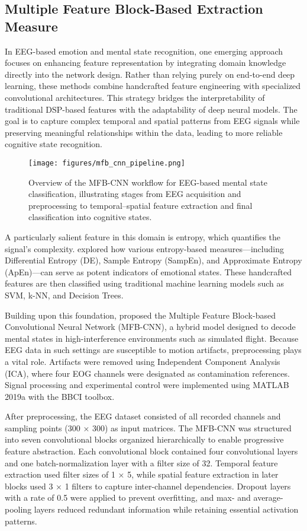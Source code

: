 \documentclass[conference]{IEEEtran}
\begin{document}
\subsection{Multiple Feature Block-Based Extraction Measure}
In EEG-based emotion and mental state recognition, one emerging approach focuses on enhancing feature representation by integrating domain knowledge directly into the network design. Rather than relying purely on end-to-end deep learning, these methods combine handcrafted feature engineering with specialized convolutional architectures. This strategy bridges the interpretability of traditional DSP-based features with the adaptability of deep neural models. The goal is to capture complex temporal and spatial patterns from EEG signals while preserving meaningful relationships within the data, leading to more reliable cognitive state recognition.

\begin{figure}[H]
    \centering
    \texttt{[image: figures/mfb\_cnn\_pipeline.png]}
    \caption{Overview of the MFB-CNN workflow for EEG-based mental state classification, illustrating stages from EEG acquisition and preprocessing to temporal–spatial feature extraction and final classification into cognitive states.}
    \label{fig:mfb_cnn_pipeline}
\end{figure}

A particularly salient feature in this domain is entropy, which quantifies the signal’s complexity. \cite{b3} explored how various entropy-based measures—including Differential Entropy (DE), Sample Entropy (SampEn), and Approximate Entropy (ApEn)—can serve as potent indicators of emotional states. These handcrafted features are then classified using traditional machine learning models such as SVM, k-NN, and Decision Trees.

Building upon this foundation, \cite{b4} proposed the Multiple Feature Block-based Convolutional Neural Network (MFB-CNN), a hybrid model designed to decode mental states in high-interference environments such as simulated flight. Because EEG data in such settings are susceptible to motion artifacts, preprocessing plays a vital role. Artifacts were removed using Independent Component Analysis (ICA), where four EOG channels were designated as contamination references. Signal processing and experimental control were implemented using MATLAB 2019a with the BBCI toolbox.

After preprocessing, the EEG dataset consisted of all recorded channels and sampling points (300 × 300) as input matrices. The MFB-CNN was structured into seven convolutional blocks organized hierarchically to enable progressive feature abstraction. Each convolutional block contained four convolutional layers and one batch-normalization layer with a filter size of 32. Temporal feature extraction used filter sizes of 1 × 5, while spatial feature extraction in later blocks used 3 × 1 filters to capture inter-channel dependencies. Dropout layers with a rate of 0.5 were applied to prevent overfitting, and max- and average-pooling layers reduced redundant information while retaining essential activation patterns.
\end{document}
